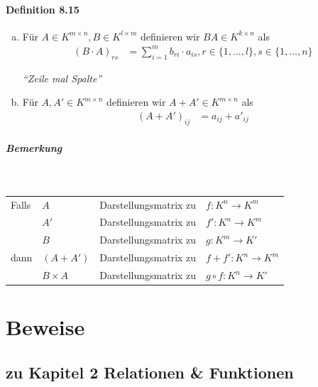 \documentclass[a5paper, 10pt]{book}
\begin{document}
			\subsubsection{Definition 8.15}
				\begin{enumerate}[a)]
					\item Für $A \in K^{m \times n}, B \in K^{l \times m}$ definieren wir $BA \in K^{k \times n}$ als
					\begin{align}
						(B\cdot A)_{rs} &= \sum_{i = 1}^{m} b_{ri} \cdot a_{is}, r \in \{1,\dots,l\}, s \in \{1,\dots, n \}
					\end{align}
					\begin{center}
						\textit{``Zeile mal Spalte''}
					\end{center}
					\item Für $A, A' \in K^{m\times n}$ definieren wir $A + A' \in K^{m\times n}$ als
					\begin{align}
						(A+A')_{ij} &= a_{ij} + a'_{ij}
					\end{align}
				\end{enumerate}
			
				\paragraph{Bemerkung}~\\
					\begin{tabular}{llll}
						Falls & $A$ & Darstellungsmatrix zu & $f: K^n \to K^m$ \\
							& $A'$ & Darstellungsmatrix zu & $f': K^n \to K^m$ \\
							& $B$ & Darstellungsmatrix zu & $g: K^m \to K'$ \vspace{0.5em}\\
						dann & $(A+A')$ & Darstellungsmatrix zu & $f+f': K^n \to K^m$ \\ 
							& $B\times A$ & Darstellungsmatrix zu & $g\circ f: K^n \to K'$
					\end{tabular} %
		
				
					
			
	\appendix
		
	\chapter{Beweise}
		
		\iffalse
		
		\section{zu Kapitel 2 Relationen \& Funktionen}
		
\end{document}
